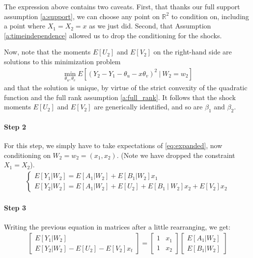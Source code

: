 \noindent The expression above contains two caveats. First, that thanks our full support assumption \ref{a:support}, we can choose any point on $\mathbb{R}^2$ to condition on, including a point where $X_1 = X_2 = x$ as we just did. Second, that Assumption \ref{a:timeindependence} allowed us to drop the conditioning for the shocks.

Now, note that the moments $E[U_2]$ and $E[V_2]$ on the right-hand side are solutions to this minimization problem
\begin{align}
  \min_{\theta_u, \theta_v}  
  E[(Y_{2} - Y_{1} - \theta_u -  x\theta_v)^2 \  | \ W_2 = w_2]
\end{align}
\noindent and that the solution is unique, by virtue of the strict convexity of the quadratic function and the full rank assumption \ref{a:full_rank}. It follows that the shock moments $E[U_2]$ and $E[V_2]$ are generically identified, and so are $\beta_1$ and $\beta_2$.


\paragraph{Step 2} For this step, we simply have to take expectations of \ref{eq:expanded}, now conditioning on $W_2 = w_2 = (x_1, x_2)$. (Note we have dropped the constraint $X_1 = X_2$).
\begin{align}
  \begin{cases}
      E[Y_{1}|W_{2}]
        = E[A_{1}|W_{2}] + E[B_{1}|W_{2}]x_{1} \\ 
      E[Y_{2}|W_{2}]
        = E[A_{1}|W_{2}] + E[U_{2}] + E[B_{1} \ | \ W_{2}]x_{2} + E[V_{2}]x_{2} 
  \end{cases}
\end{align}

\paragraph{Step 3} Writing the previous equation in matrices after a little rearranging, we get:
\begin{align}
  \begin{bmatrix}
    E[Y_{1}|W_{2}] \\  
    E[Y_{2}|W_{2}] - E[U_{2}] -  E[V_{2}]x_{t} 
  \end{bmatrix}
  =
  \begin{bmatrix}
    1 & x_1 \\
    1 & x_2  
  \end{bmatrix}
  \begin{bmatrix}
    E[A_{1}|W_{2}] \\
    E[B_{1}|W_{2}]
  \end{bmatrix}
\end{align}

